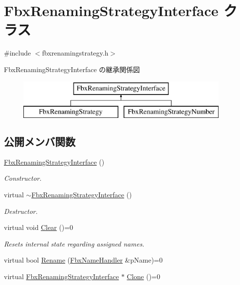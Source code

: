 \hypertarget{class_fbx_renaming_strategy_interface}{}\section{Fbx\+Renaming\+Strategy\+Interface クラス}
\label{class_fbx_renaming_strategy_interface}


{\ttfamily \#include $<$fbxrenamingstrategy.\+h$>$}

Fbx\+Renaming\+Strategy\+Interface の継承関係図\begin{figure}[H]
\begin{center}
\leavevmode
\includegraphics[height=2.000000cm]{class_fbx_renaming_strategy_interface}
\end{center}
\end{figure}
\subsection*{公開メンバ関数}
\begin{DoxyCompactItemize}
\item 
\hyperlink{class_fbx_renaming_strategy_interface_a4c211fabbf906c3e3102a17febe1a428}{Fbx\+Renaming\+Strategy\+Interface} ()
\begin{DoxyCompactList}\small\item\em Constructor. \end{DoxyCompactList}\item 
virtual \hyperlink{class_fbx_renaming_strategy_interface_ab52664f630e238593eeba2bb204cebbe}{$\sim$\+Fbx\+Renaming\+Strategy\+Interface} ()
\begin{DoxyCompactList}\small\item\em Destructor. \end{DoxyCompactList}\item 
virtual void \hyperlink{class_fbx_renaming_strategy_interface_a2090b5ae43936b617ec5d75015923f69}{Clear} ()=0
\begin{DoxyCompactList}\small\item\em Resets internal state regarding assigned names. \end{DoxyCompactList}\item 
virtual bool \hyperlink{class_fbx_renaming_strategy_interface_a1b91016c68dd9c7031624026fd39638a}{Rename} (\hyperlink{class_fbx_name_handler}{Fbx\+Name\+Handler} \&p\+Name)=0
\item 
virtual \hyperlink{class_fbx_renaming_strategy_interface}{Fbx\+Renaming\+Strategy\+Interface} $\ast$ \hyperlink{class_fbx_renaming_strategy_interface_ab394ed8a9b5d3ec40334bc933af83907}{Clone} ()=0
\end{DoxyCompactItemize}


